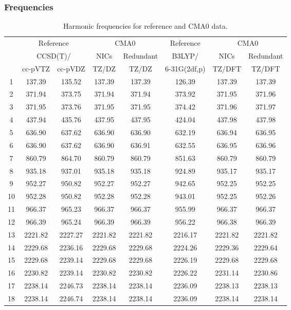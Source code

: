 \documentclass[10pt,oneside]{article}
\begin{document}
\begin{table}[h!]
\subsubsection*{Frequencies}
\centering
\caption{Harmonic frequencies for reference and CMA0 data.}
\begin{tabular}{cccccccc}
\toprule
{} & \multicolumn{2}{c}{Reference} & \multicolumn{2}{c}{CMA0} &    Reference & \multicolumn{2}{c}{CMA0} \\
{} & \multicolumn{2}{c}{CCSD(T)/} &    NICs &  Redundant &       B3LYP/ &    NICs & Redundant \\
{} &   cc-pVTZ & cc-pVDZ &   TZ/DZ &      TZ/DZ & 6-31G(2df,p) &  TZ/DFT &    TZ/DFT \\
\midrule
1  &    137.39 &  135.52 &  137.39 &     137.39 &       126.39 &  137.39 &    137.39 \\
2  &    371.94 &  373.75 &  371.94 &     371.94 &       373.92 &  371.95 &    371.96 \\
3  &    371.95 &  373.76 &  371.95 &     371.95 &       374.42 &  371.96 &    371.97 \\
4  &    437.94 &  435.76 &  437.95 &     437.95 &       424.04 &  437.98 &    437.98 \\
5  &    636.90 &  637.62 &  636.90 &     636.90 &       632.19 &  636.94 &    636.95 \\
6  &    636.90 &  637.62 &  636.90 &     636.91 &       632.55 &  636.95 &    636.96 \\
7  &    860.79 &  864.70 &  860.79 &     860.79 &       851.63 &  860.79 &    860.79 \\
8  &    935.18 &  937.01 &  935.18 &     935.18 &       924.89 &  935.17 &    935.17 \\
9  &    952.27 &  950.82 &  952.27 &     952.27 &       942.65 &  952.25 &    952.25 \\
10 &    952.28 &  950.82 &  952.28 &     952.28 &       943.01 &  952.25 &    952.26 \\
11 &    966.37 &  965.23 &  966.37 &     966.37 &       955.99 &  966.37 &    966.37 \\
12 &    966.39 &  965.24 &  966.39 &     966.39 &       956.22 &  966.38 &    966.39 \\
13 &   2221.82 & 2227.27 & 2221.82 &    2221.82 &      2216.17 & 2221.82 &   2221.82 \\
14 &   2229.68 & 2236.16 & 2229.68 &    2229.68 &      2224.26 & 2229.36 &   2229.64 \\
15 &   2229.68 & 2239.14 & 2229.68 &    2229.68 &      2226.19 & 2229.68 &   2229.68 \\
16 &   2230.82 & 2239.14 & 2230.82 &    2230.82 &      2226.22 & 2231.14 &   2230.86 \\
17 &   2238.14 & 2246.73 & 2238.14 &    2238.14 &      2236.09 & 2238.13 &   2238.13 \\
18 &   2238.14 & 2246.74 & 2238.14 &    2238.14 &      2236.09 & 2238.14 &   2238.14 \\
\bottomrule
\end{tabular}
\end{table}
\end{document}
